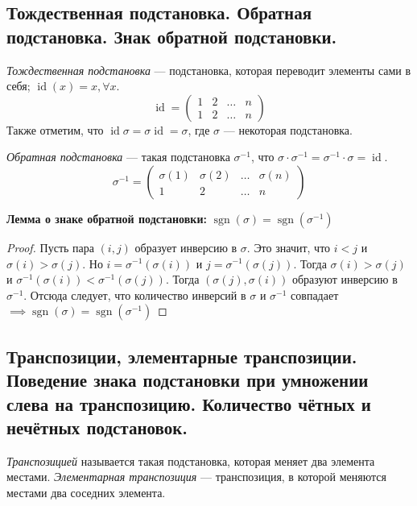 \documentclass[a4paper, 12pt]{article}
\DeclareMathOperator{\sgn}{sgn}
\DeclareMathOperator{\id}{id}
\begin{document}
\subsection{Тождественная подстановка. Обратная подстановка. Знак обратной подстановки.}
\textit{Тождественная подстановка} — подстановка, которая переводит элементы сами в себя; $\id(x) = x,  \forall x$.  
\[\id = \begin{pmatrix}
	1 & 2 & \ldots & n \\
	1 & 2 & \ldots & n
\end{pmatrix}\]
Также отметим, что $\id\sigma = \sigma\id = \sigma$, где $\sigma$ --- некоторая подстановка.

\textit{Обратная подстановка} — такая подстановка $\sigma^{-1}$, что $\sigma \cdot \sigma^{-1} = \sigma^{-1} \cdot \sigma = \id$.
\[\sigma^{-1} = \begin{pmatrix}
	\sigma(1) & \sigma(2) & \ldots & \sigma(n) \\
	1 & 2 & \dots & n
\end{pmatrix}\]

\textbf{Лемма о знаке обратной подстановки:} $\sgn(\sigma) = \sgn(\sigma^{-1})$
\begin{proof}
Пусть пара $(i,j)$ образует инверсию в $\sigma$. Это значит, что $i < j$ и $\sigma(i) > \sigma(j)$. Но $i = \sigma^{-1}(\sigma(i))$ и $j = \sigma^{-1}(\sigma(j))$. Тогда $\sigma(i) > \sigma(j)$ и $\sigma^{-1}(\sigma(i)) < \sigma^{-1}(\sigma(j))$. Тогда $(\sigma(j), \sigma(i))$ образуют инверсию в $\sigma^{-1}$. Отсюда следует, что количество инверсий в $\sigma$ и $\sigma^{-1}$ совпадает $\implies \sgn(\sigma) = \sgn(\sigma^{-1})$
\end{proof}

\subsection{Транспозиции, элементарные транспозиции. Поведение знака подстановки при умножении слева на транспозицию. Количество чётных и нечётных подстановок.}
\textit{Транспозицией} называется такая подстановка, которая меняет два элемента местами. \textit{Элементарная транспозиция} — транспозиция, в которой меняются местами два соседних элемента.
\end{document}
